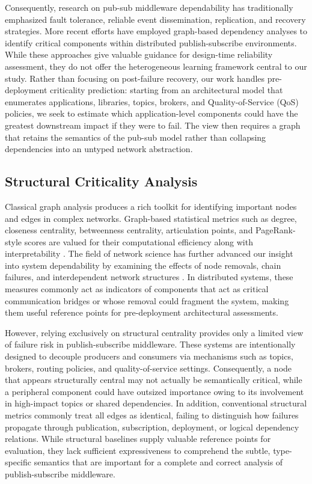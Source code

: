 \documentclass[review]{elsarticle}
\begin{document}
Consequently, research on pub-sub middleware dependability has traditionally emphasized fault
tolerance, reliable event dissemination, replication, and recovery strategies. More recent efforts
have employed graph-based dependency analyses to identify critical components within distributed
publish-subscribe environments. While these approaches give valuable guidance for design-time
reliability assessment, they do not offer the heterogeneous learning framework central to our
study. Rather than focusing on post-failure recovery, our work handles pre-deployment criticality
prediction: starting from an architectural model that enumerates applications, libraries, topics,
brokers, and Quality-of-Service (QoS) policies, we seek to estimate which application-level
components could have the greatest downstream impact if they were to fail. The view then requires a
graph that retains the semantics of the pub-sub model rather than collapsing dependencies into an
untyped network abstraction.

\subsection{Structural Criticality Analysis}

Classical graph analysis produces a rich toolkit for identifying important nodes and edges in
complex networks. Graph-based statistical metrics such as degree, closeness centrality, betweenness
centrality, articulation points, and PageRank-style scores are valued for their computational
efficiency along with interpretability \cite{Freeman1977,Brandes2001,BrinPage1998}. The field of
network science has further advanced our insight into system dependability by examining the effects
of node removals, chain failures, and interdependent network structures
\cite{Albert2000,Buldyrev2010}. In distributed systems, these measures commonly act as indicators of
components that act as critical communication bridges or whose removal could fragment the system,
making them useful reference points for pre-deployment architectural assessments.

However, relying exclusively on structural centrality provides only a limited view of failure risk
in publish-subscribe middleware. These systems are intentionally designed to decouple producers and
consumers via mechanisms such as topics, brokers, routing policies, and quality-of-service settings.
Consequently, a node that appears structurally central may not actually be semantically critical,
while a peripheral component could have outsized importance owing to its involvement in high-impact
topics or shared dependencies. In addition, conventional structural metrics commonly treat all edges
as identical, failing to distinguish how failures propagate through publication, subscription,
deployment, or logical dependency relations. While structural baselines supply valuable reference
points for evaluation, they lack sufficient expressiveness to comprehend the subtle, type-specific
semantics that are important for a complete and correct analysis of publish-subscribe middleware.
\end{document}

